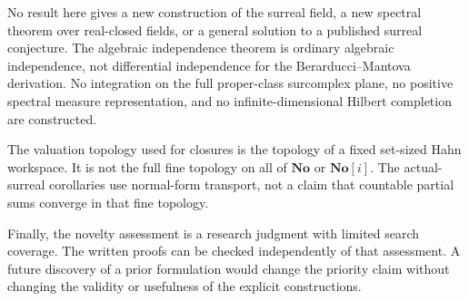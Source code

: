 \documentclass[11pt,oneside]{article}
\theoremstyle{definition}
\theoremstyle{remark}
\newcommand{\No}{\mathbf{No}}
\begin{document}
No result here gives a new construction of the surreal field, a new
spectral theorem over real-closed fields, or a general solution to a
published surreal conjecture. The algebraic independence theorem is
ordinary algebraic independence, not differential independence for the
Berarducci--Mantova derivation. No integration on the full proper-class
surcomplex plane, no positive spectral measure representation, and no
infinite-dimensional Hilbert completion are constructed.

The valuation topology used for closures is the topology of a fixed
set-sized Hahn workspace. It is not the full fine topology on all of
$\No$ or $\No[i]$. The actual-surreal corollaries use normal-form
transport, not a claim that countable partial sums converge in that
fine topology.

Finally, the novelty assessment is a research judgment with limited
search coverage. The written proofs can be checked independently of
that assessment. A future discovery of a prior formulation would change
the priority claim without changing the validity or usefulness of the
explicit constructions.
\end{document}
